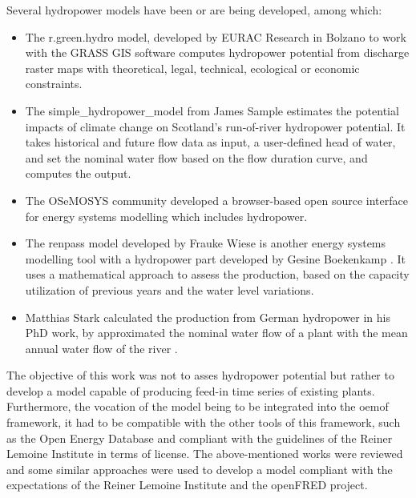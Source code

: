 Several hydropower models have been or are being developed, among which: 
\begin{itemize}
 \item The r.green.hydro model, developed by EURAC Research in Bolzano \cite{grass} to work with the GRASS GIS software computes hydropower potential from discharge raster maps with theoretical, legal, technical, ecological or economic constraints.
 \item The simple{\_}hydropower{\_}model from James Sample \cite{sample} estimates the potential impacts of climate change on Scotland's run-of-river hydropower potential. It takes historical and future flow data as input, a user-defined head of water, and set the nominal water flow based on the flow duration curve, and computes the output.
 \item The OSeMOSYS community \cite{osemosys} developed a browser-based open source interface for energy systems modelling which includes hydropower.
 \item The renpass model \cite{wiese} developed by Frauke Wiese is another energy systems modelling tool with a hydropower part developed by Gesine Boekenkamp \cite{gesine}. It uses a mathematical approach to assess the production, based on the capacity utilization of previous years and the water level variations.
 \item Matthias Stark calculated the production from German hydropower in his PhD work, by approximated the nominal water flow of a plant with the mean annual water flow of the river \cite{stark}.
\end{itemize}
The objective of this work was not to asses hydropower potential but rather to develop a model capable of producing feed-in time series of existing plants. Furthermore, the vocation of the model being to be integrated into the oemof framework, it had to be compatible with the other tools of this framework, such as the Open Energy Database and compliant with the guidelines of the Reiner Lemoine Institute in terms of license. The above-mentioned works were reviewed and some similar approaches were used to develop a model compliant with the expectations of the Reiner Lemoine Institute and the openFRED project.